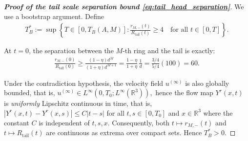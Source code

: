 \documentclass[reqno,11pt]{amsart}
\begin{document}
\begin{proof}[\textbf{Proof of the tail scale separation bound \eqref{eq:tail_head_separation}}]
We use a bootstrap argument. Define 
\begin{align*}
    T^*_B := \sup \left\{ T \in [0, T_B(A,M)] : \frac{r_{M,-}(t)}{R_{\mathrm{tail}}(t)} \ge 4 \quad \text{for all } t \in [0, T] \right\}.
\end{align*}

At $t=0$, the separation between the $M$-th ring and the tail is exactly:
\begin{align*}
    \frac{r_{M,-}(0)}{R_{\mathrm{tail}}(0)} \geq  \frac{(1-\eta)d^{M}}{(1+\eta)d^{M+1}} = \frac{1-\eta}{1+\eta} \, \frac{1}{d}=
    \frac{3/4}{5/4} (100) = 60.
\end{align*}

Under the contradiction hypothesis, the velocity field $u^{(\infty)}$ is also globally bounded, that is, $u^{(\infty)}\in L^\infty(0,T_0; L^\infty(\mathbb{R}^3)),$ hence the flow map $Y^r(x,t)$ is \emph{uniformly} Lipschitz continuous in time, that is,
$|Y^r(x,t)-Y^r(x,s)| \leq C |t-s|$ for all $t,s\in [0,T_0]$ and $x\in \mathbb{R}^3$ where the constant $C$ is independent of $t,s,x$. Consequently, 
both $t\mapsto r_{M,-}(t)$ and $t\mapsto R_{\mathrm{tail}}(t)$ are continuous as extrema over compact sets. Hence $T^*_B>0$.




\end{proof}
\end{document}
